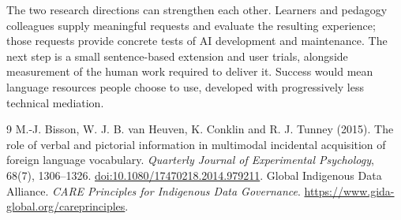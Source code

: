 \documentclass[11pt,a4paper]{article}
\begin{document}
The two research directions can strengthen each other. Learners and pedagogy
colleagues supply meaningful requests and evaluate the resulting experience;
those requests provide concrete tests of AI development and maintenance.
The next step is a small sentence-based extension and user trials, alongside
measurement of the human work required to deliver it. Success would mean
language resources people choose to use, developed with progressively less
technical mediation.

\begin{thebibliography}{9}
\small
{} M.-J. Bisson, W. J. B. van Heuven, K. Conklin and R. J. Tunney
(2015). The role of verbal and pictorial information in multimodal incidental
acquisition of foreign language vocabulary. \emph{Quarterly Journal of
Experimental Psychology}, 68(7), 1306--1326.
\href{https://doi.org/10.1080/17470218.2014.979211}{doi:10.1080/17470218.2014.979211}.
 Global Indigenous Data Alliance.
\emph{CARE Principles for Indigenous Data Governance}.
\url{https://www.gida-global.org/careprinciples}.
\end{thebibliography}
\end{document}
